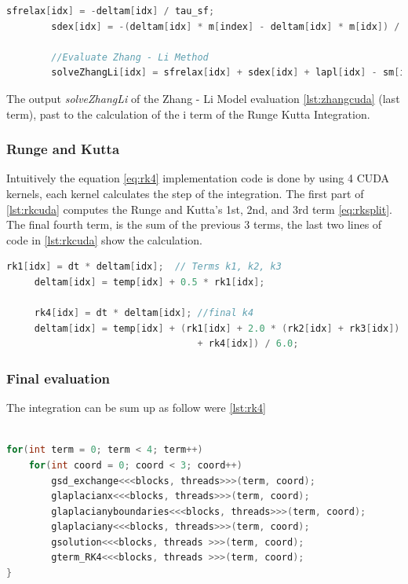 \begin{lstlisting}[language=C++, label={lst:zhangcuda}, caption={Runge and Kutta 4th Terms}]
		sfrelax[idx] = -deltam[idx] / tau_sf;
		sdex[idx] = -(deltam[idx] * m[index] - deltam[idx] * m[idx]) / tau_sd;
		
		//Evaluate Zhang - Li Method
        solveZhangLi[idx] = sfrelax[idx] + sdex[idx] + lapl[idx] - sm[idx];
\end{lstlisting}


The output  \textit{solveZhangLi} of the Zhang - Li Model evaluation \ref{lst:zhangcuda}  (last term), past to the calculation of the i term of the Runge Kutta Integration.

\subsubsection{Runge and Kutta}
 
  Intuitively the equation \ref{eq:rk4} implementation code is done by using 4 CUDA kernels, each kernel calculates the step of the integration. The first part of \ref{lst:rkcuda} computes the Runge and Kutta's 1st, 2nd, and 3rd  term \ref{eq:rksplit}. The final fourth term, is the sum of the previous 3 terms, the last two lines of code in \ref{lst:rkcuda} show the calculation.

\begin{lstlisting}[language=C++, label={lst:rkcuda}, caption={Runge and Kutta 4th Terms}]
     rk1[idx] = dt * deltam[idx];  // Terms k1, k2, k3
     deltam[idx] = temp[idx] + 0.5 * rk1[idx];
     
     rk4[idx] = dt * deltam[idx]; //final k4
     deltam[idx] = temp[idx] + (rk1[idx] + 2.0 * (rk2[idx] + rk3[idx])
                                  + rk4[idx]) / 6.0;
\end{lstlisting}


\subsubsection{Final evaluation}

The integration can be sum up as follow were
\ref{lst:rk4}
\begin{lstlisting}[language=C++, label={lst:rk4}, caption={Runge y Kutta integration}]	

for(int term = 0; term < 4; term++)
	for(int coord = 0; coord < 3; coord++)
    	gsd_exchange<<<blocks, threads>>>(term, coord);
    	glaplacianx<<<blocks, threads>>>(term, coord);
    	glaplacianyboundaries<<<blocks, threads>>>(term, coord);
    	glaplaciany<<<blocks, threads>>>(term, coord);
    	gsolution<<<blocks, threads >>>(term, coord);
    	gterm_RK4<<<blocks, threads >>>(term, coord);
}
\end{lstlisting}


